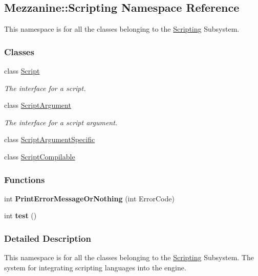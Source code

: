 \hypertarget{namespaceMezzanine_1_1Scripting}{
\subsection{Mezzanine::Scripting Namespace Reference}
\label{namespaceMezzanine_1_1Scripting}
}


This namespace is for all the classes belonging to the \hyperlink{namespaceMezzanine_1_1Scripting}{Scripting} Subsystem.  


\subsubsection*{Classes}
\begin{DoxyCompactItemize}
\item 
class \hyperlink{classMezzanine_1_1Scripting_1_1Script}{Script}
\begin{DoxyCompactList}\small\item\em The interface for a script. \item\end{DoxyCompactList}\item 
class \hyperlink{classMezzanine_1_1Scripting_1_1ScriptArgument}{ScriptArgument}
\begin{DoxyCompactList}\small\item\em The interface for a script argument. \item\end{DoxyCompactList}\item 
class \hyperlink{classMezzanine_1_1Scripting_1_1ScriptArgumentSpecific}{ScriptArgumentSpecific}
\item 
class \hyperlink{classMezzanine_1_1Scripting_1_1ScriptCompilable}{ScriptCompilable}
\end{DoxyCompactItemize}
\subsubsection*{Functions}
\begin{DoxyCompactItemize}
\item 
\hypertarget{namespaceMezzanine_1_1Scripting_a2e788c7aa4347675e5cbebd98c4ecf04}{
int {\bfseries PrintErrorMessageOrNothing} (int ErrorCode)}
\label{namespaceMezzanine_1_1Scripting_a2e788c7aa4347675e5cbebd98c4ecf04}

\item 
\hypertarget{namespaceMezzanine_1_1Scripting_ae71396d93577c9390e62888950d9ba80}{
int {\bfseries test} ()}
\label{namespaceMezzanine_1_1Scripting_ae71396d93577c9390e62888950d9ba80}

\end{DoxyCompactItemize}


\subsubsection{Detailed Description}
This namespace is for all the classes belonging to the \hyperlink{namespaceMezzanine_1_1Scripting}{Scripting} Subsystem. The system for integrating scripting languages into the engine. 